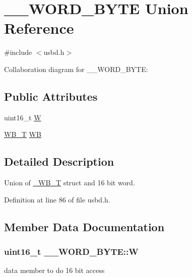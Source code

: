 \hypertarget{union____WORD__BYTE}{}\section{\+\_\+\+\_\+\+W\+O\+R\+D\+\_\+\+B\+Y\+TE Union Reference}
\label{union____WORD__BYTE}


{\ttfamily \#include $<$usbd.\+h$>$}



Collaboration diagram for \+\_\+\+\_\+\+W\+O\+R\+D\+\_\+\+B\+Y\+TE\+:
\subsection*{Public Attributes}
\begin{DoxyCompactItemize}
\item 
uint16\+\_\+t \hyperlink{union____WORD__BYTE_a90d5487c4190ce9c502f070f4a7a59e9}{W}
\item 
\hyperlink{group__USBD__Core_ga4fbe30f5ac133f5bb15c653a19162ae9}{W\+B\+\_\+T} \hyperlink{union____WORD__BYTE_a3ea700711d4333320b15562bbf2ab59c}{WB}
\end{DoxyCompactItemize}


\subsection{Detailed Description}
Union of \hyperlink{struct__WB__T}{\+\_\+\+W\+B\+\_\+T} struct and 16 bit word. 

Definition at line 86 of file usbd.\+h.



\subsection{Member Data Documentation}
\subsubsection[{\texorpdfstring{W}{W}}]{\setlength{\rightskip}{0pt plus 5cm}uint16\+\_\+t \+\_\+\+\_\+\+W\+O\+R\+D\+\_\+\+B\+Y\+T\+E\+::W}\hypertarget{union____WORD__BYTE_a90d5487c4190ce9c502f070f4a7a59e9}{}\label{union____WORD__BYTE_a90d5487c4190ce9c502f070f4a7a59e9}
data member to do 16 bit access 

